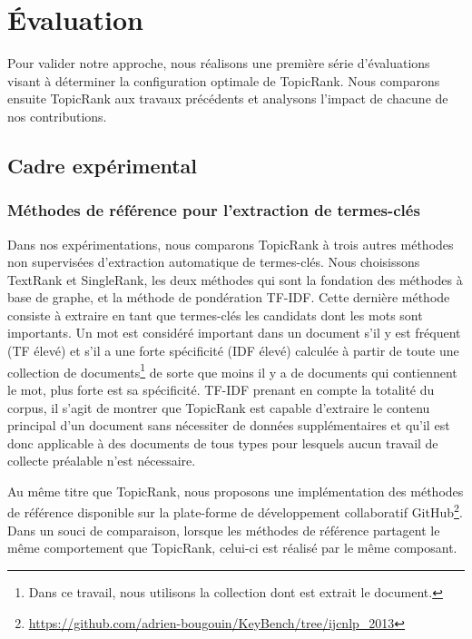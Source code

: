 \section{Évaluation}
\label{sec:evaluation}
  Pour valider notre approche, nous réalisons une première série d'évaluations
  visant à déterminer la configuration optimale de TopicRank. Nous comparons 
  ensuite Topic\-Rank aux travaux précédents et analysons l'impact de chacune de
  nos contributions.

  \subsection{Cadre expérimental}
  \label{subsec:cadre_experimental}
    \subsubsection{Méthodes de référence pour l'extraction de termes-clés}
    \label{subsubsec:systemes_de_reference_pour_l_extraction_de_termes_cles}
      Dans nos expérimentations, nous comparons TopicRank à trois autres
      méthodes non supervisées d'extraction automatique de termes-clés. Nous
      choisissons TextRank et SingleRank, les deux méthodes qui sont la
      fondation des méthodes à base de graphe, et la méthode de pondération
      TF-IDF. Cette dernière méthode consiste à extraire en tant que termes-clés
      les candidats dont les mots sont importants. Un mot est considéré
      important dans un document s'il y est fréquent (TF élevé) et s'il a une
      forte spécificité (IDF élevé) calculée à partir de toute une collection de
      documents\footnote{Dans ce travail, nous utilisons la collection dont est
      extrait le document.} de sorte que moins il y a de documents qui
      contiennent le mot, plus forte est sa spécificité. TF-IDF prenant en
      compte la totalité du corpus, il s'agit de montrer que TopicRank est
      capable d'extraire le contenu principal d'un document sans nécessiter de
      données supplémentaires et qu'il est donc applicable à des documents de
      tous types pour lesquels aucun travail de collecte préalable n'est
      nécessaire.

      Au même titre que TopicRank, nous proposons une implémentation des
      méthodes de référence disponible sur la plate-forme de développement
      collaboratif
      GitHub\footnote{\url{https://github.com/adrien-bougouin/KeyBench/tree/ijcnlp_2013}}.
      Dans un souci de comparaison, lorsque les méthodes de référence partagent
      le même comportement que TopicRank, celui-ci est réalisé par le même
      composant.

